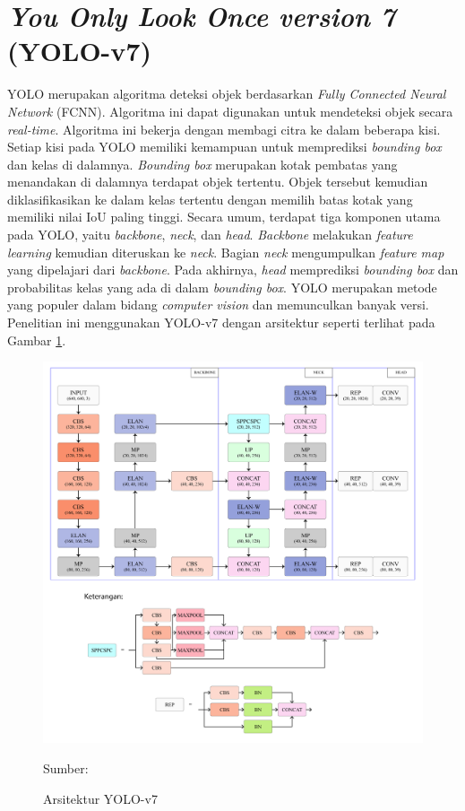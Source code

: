\section{\textit{You Only Look Once version 7} (YOLO-v7)}
YOLO merupakan algoritma deteksi objek berdasarkan \textit{Fully Connected Neural Network} (FCNN). Algoritma ini dapat digunakan untuk mendeteksi objek secara \textit{real-time}. Algoritma ini bekerja dengan membagi citra ke dalam beberapa kisi. Setiap kisi pada YOLO memiliki kemampuan untuk memprediksi \textit{bounding box} dan kelas di dalamnya. \textit{Bounding box} merupakan kotak pembatas yang menandakan di dalamnya terdapat objek tertentu. Objek tersebut kemudian diklasifikasikan ke dalam kelas tertentu dengan memilih batas kotak yang memiliki nilai IoU paling tinggi. Secara umum, terdapat tiga komponen utama pada YOLO, yaitu \textit{backbone}, \textit{neck}, dan \textit{head}. \textit{Backbone} melakukan \textit{feature learning} kemudian diteruskan ke \textit{neck}. Bagian \textit{neck} mengumpulkan \textit{feature map} yang dipelajari dari \textit{backbone}. Pada akhirnya, \textit{head} memprediksi \textit{bounding box} dan probabilitas kelas yang ada di dalam \textit{bounding box}. YOLO merupakan metode yang populer dalam bidang \textit{computer vision} dan memunculkan banyak versi. Penelitian ini menggunakan YOLO-v7 dengan arsitektur seperti terlihat pada Gambar \ref{fig:yolov7-archi}.
\begin{figure}[H]
    \begin{center}
        \includegraphics[width=13cm]{img/bab2/yolov7-architecture.png}
        \caption{Arsitektur YOLO-v7}
        \label{fig:yolov7-archi}
        Sumber: \citep{Wang2022}
    \end{center}
\end{figure}

